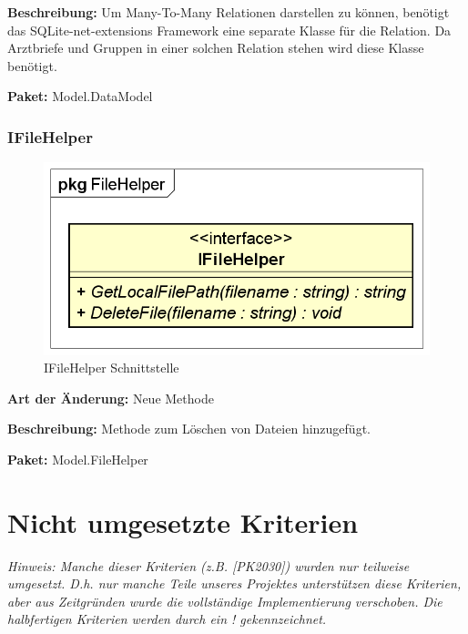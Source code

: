 \documentclass[a4paper]{scrreprt}
\begin{document}
\textbf{Beschreibung:} Um Many-To-Many Relationen darstellen zu können, benötigt das SQLite-net-extensions Framework eine separate Klasse für die Relation. Da Arztbriefe und Gruppen in einer solchen Relation stehen wird diese Klasse benötigt.

\textbf{Paket:} Model.DataModel

\subsubsection{IFileHelper}
\begin{figure}[H]
\centering
\includegraphics[width=0.75\textheight]{graphics/Klassendiagramme/Model/IFileHelper.png}
\caption{IFileHelper Schnittstelle}
\end{figure}
\textbf{Art der Änderung:} Neue Methode

\textbf{Beschreibung:} Methode zum Löschen von Dateien hinzugefügt.

\textbf{Paket:} Model.FileHelper

\section{Nicht umgesetzte Kriterien}
\textit{Hinweis: Manche dieser Kriterien (z.B. [PK2030]) wurden nur teilweise umgesetzt. D.h. nur manche Teile unseres Projektes unterstützen diese Kriterien, aber aus Zeitgründen wurde die vollständige Implementierung verschoben. Die halbfertigen Kriterien werden durch ein \dq{}!\dq{} gekennzeichnet.}
\end{document}

